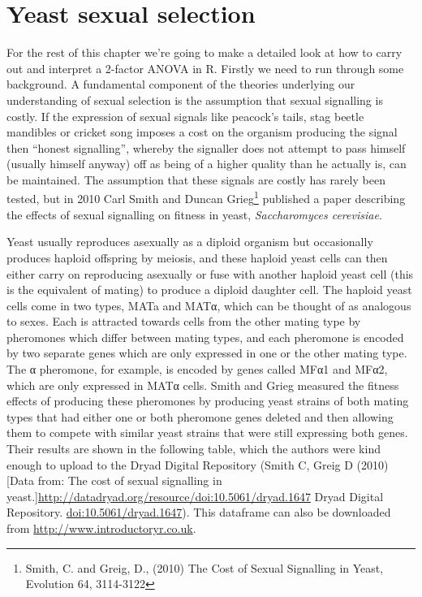 \documentclass[
]{book}
\begin{document}
\hypertarget{yeast-sexual-selection}{%
\section{Yeast sexual selection}\label{yeast-sexual-selection}}

For the rest of this chapter we're going to make a detailed look at how to carry out and interpret a 2-factor ANOVA in R. Firstly we need to run through some background. A fundamental component of the theories underlying our understanding of sexual selection is the assumption that sexual signalling is costly. If the expression of sexual signals like peacock's tails, stag beetle mandibles or cricket song imposes a cost on the organism producing the signal then ``honest signalling'', whereby the signaller does not attempt to pass himself (usually himself anyway) off as being of a higher quality than he actually is, can be maintained. The assumption that these signals are costly has rarely been tested, but in 2010 Carl Smith and Duncan Grieg\footnote{Smith, C. and Greig, D., (2010) The Cost of Sexual Signalling in Yeast, Evolution 64, 3114-3122} published a paper describing the effects of sexual signalling on fitness in yeast, \emph{Saccharomyces cerevisiae}.

Yeast usually reproduces asexually as a diploid organism but occasionally produces haploid offspring by meiosis, and these haploid yeast cells can then either carry on reproducing asexually or fuse with another haploid yeast cell (this is the equivalent of mating) to produce a diploid daughter cell. The haploid yeast cells come in two types, MATa and MATα, which can be thought of as analogous to sexes. Each is attracted towards cells from the other mating type by pheromones which differ between mating types, and each pheromone is encoded by two separate genes which are only expressed in one or the other mating type. The α pheromone, for example, is encoded by genes called MFα1 and MFα2, which are only expressed in MATα cells. Smith and Grieg measured the fitness effects of producing these pheromones by producing yeast strains of both mating types that had either one or both pheromone genes deleted and then allowing them to compete with similar yeast strains that were still expressing both genes. Their results are shown in the following table, which the authors were kind enough to upload to the Dryad Digital Repository (Smith C, Greig D (2010) {[}Data from: The cost of sexual signalling in yeast.{]}\url{http://datadryad.org/resource/doi:10.5061/dryad.1647} Dryad Digital Repository. \url{doi:10.5061/dryad.1647}). This dataframe can also be downloaded from \url{http://www.introductoryr.co.uk}.
\end{document}
